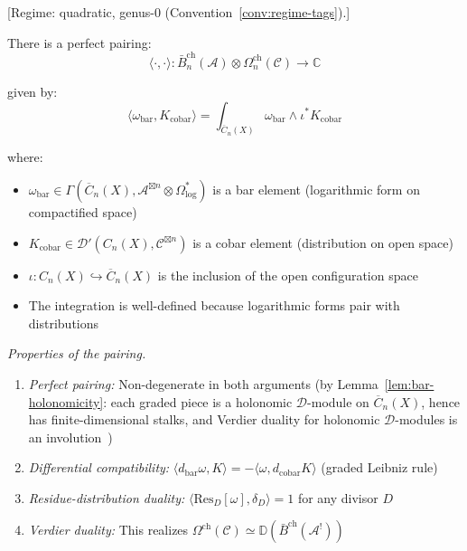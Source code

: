 \begin{theorem}\label{thm:bar-cobar-verdier}
\label{thm:verdier-bar-cobar}
\textup{[Regime: quadratic, genus-$0$
\textup{(}Convention~\textup{\ref{conv:regime-tags})}.]}

There is a perfect pairing:
\[\langle \cdot, \cdot \rangle: \bar{B}^{\text{ch}}_n(\mathcal{A}) \otimes 
\Omega^{\text{ch}}_n(\mathcal{C}) \to \mathbb{C}\]

given by:
\[\langle \omega_{\text{bar}}, K_{\text{cobar}} \rangle = \int_{\overline{C}_n(X)} 
\omega_{\text{bar}} \wedge \iota^* K_{\text{cobar}}\]

where:
\begin{itemize}
\item $\omega_{\text{bar}} \in \Gamma(\overline{C}_n(X), \mathcal{A}^{\boxtimes n} 
\otimes \Omega^*_{\log})$ is a bar element (logarithmic form on compactified space)
\item $K_{\text{cobar}} \in \mathcal{D}'(C_n(X), \mathcal{C}^{\boxtimes n})$ is 
a cobar element (distribution on open space)
\item $\iota: C_n(X) \hookrightarrow \overline{C}_n(X)$ is the inclusion of the 
open configuration space
\item The integration is well-defined because logarithmic forms pair with distributions
\end{itemize}

\emph{Properties of the pairing.}
\begin{enumerate}
\item \emph{Perfect pairing:} Non-degenerate in both arguments (by Lemma~\ref{lem:bar-holonomicity}: each graded piece is a holonomic $\mathcal{D}$-module on $\overline{C}_n(X)$, hence has finite-dimensional stalks, and Verdier duality for holonomic $\mathcal{D}$-modules is an involution~\cite{KS90})
\item \emph{Differential compatibility:} $\langle d_{\text{bar}}\omega, K \rangle 
= -\langle \omega, d_{\text{cobar}}K \rangle$ (graded Leibniz rule)
\item \emph{Residue-distribution duality:} $\langle \text{Res}_{D}[\omega], 
\delta_D \rangle = 1$ for any divisor $D$
\item \emph{Verdier duality:} This realizes $\Omega^{\text{ch}}(\mathcal{C}) 
\simeq \mathbb{D}(\bar{B}^{\text{ch}}(\mathcal{A}^!))$
\end{enumerate}
\end{theorem}

